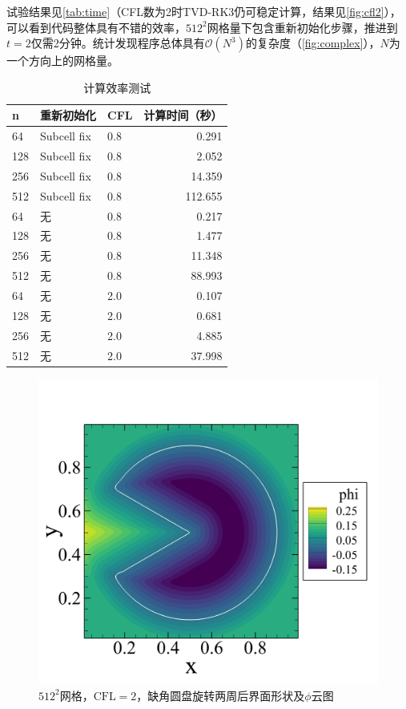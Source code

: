 \documentclass[11pt]{article}
\begin{document}
试验结果见\autoref{tab:time}（CFL数为2时TVD-RK3仍可稳定计算，结果见\autoref{fig:cfl2}），可以看到代码整体具有不错的效率，$512^2$网格量下包含重新初始化步骤，推进到$t=2$仅需2分钟。统计发现程序总体具有$\mathcal{O}(N^3)$的复杂度（\autoref{fig:complex}），$N$为一个方向上的网格量。
\begin{table}[h]
    \centering
    \caption{\label{tab:time}计算效率测试}
    \begin{tabular}{lllr}
        \toprule
        n   & 重新初始化  & CFL & 计算时间（秒） \\
        \midrule
        64  & Subcell fix & 0.8 & 0.291          \\
        128 & Subcell fix & 0.8 & 2.052          \\
        256 & Subcell fix & 0.8 & 14.359         \\
        512 & Subcell fix & 0.8 & 112.655        \\
        \midrule
        64  & 无          & 0.8 & 0.217          \\
        128 & 无          & 0.8 & 1.477          \\
        256 & 无          & 0.8 & 11.348         \\
        512 & 无          & 0.8 & 88.993         \\
        \midrule
        64  & 无          & 2.0 & 0.107          \\
        128 & 无          & 2.0 & 0.681          \\
        256 & 无          & 2.0 & 4.885          \\
        512 & 无          & 2.0 & 37.998         \\
        \bottomrule
    \end{tabular}
\end{table}

\begin{figure}[htbp]
    \centering
    \includegraphics[width=0.6\linewidth]{figure/cfl20n512s130t20.png}
    \caption{\label{fig:cfl2}$512^2$网格，$\text{CFL}=2$，缺角圆盘旋转两周后界面形状及$\phi$云图}
\end{figure}
\end{document}
